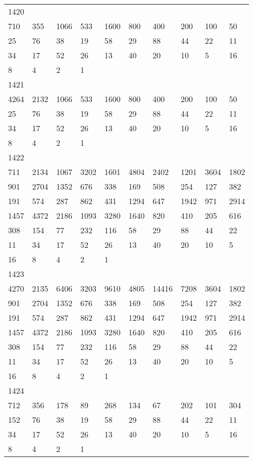 \begin{longtable}{*{10}{l}}
1420&&&&&&&&&\\
710& 355& 1066& 533& 1600& 800& 400& 200& 100& 50\\
25& 76& 38& 19& 58& 29& 88& 44& 22& 11\\
34& 17& 52& 26& 13& 40& 20& 10& 5& 16\\
8& 4& 2& 1& \\

1421&&&&&&&&&\\
4264& 2132& 1066& 533& 1600& 800& 400& 200& 100& 50\\
25& 76& 38& 19& 58& 29& 88& 44& 22& 11\\
34& 17& 52& 26& 13& 40& 20& 10& 5& 16\\
8& 4& 2& 1& \\

1422&&&&&&&&&\\
711& 2134& 1067& 3202& 1601& 4804& 2402& 1201& 3604& 1802\\
901& 2704& 1352& 676& 338& 169& 508& 254& 127& 382\\
191& 574& 287& 862& 431& 1294& 647& 1942& 971& 2914\\
1457& 4372& 2186& 1093& 3280& 1640& 820& 410& 205& 616\\
308& 154& 77& 232& 116& 58& 29& 88& 44& 22\\
11& 34& 17& 52& 26& 13& 40& 20& 10& 5\\
16& 8& 4& 2& 1& \\

1423&&&&&&&&&\\
4270& 2135& 6406& 3203& 9610& 4805& 14416& 7208& 3604& 1802\\
901& 2704& 1352& 676& 338& 169& 508& 254& 127& 382\\
191& 574& 287& 862& 431& 1294& 647& 1942& 971& 2914\\
1457& 4372& 2186& 1093& 3280& 1640& 820& 410& 205& 616\\
308& 154& 77& 232& 116& 58& 29& 88& 44& 22\\
11& 34& 17& 52& 26& 13& 40& 20& 10& 5\\
16& 8& 4& 2& 1& \\

1424&&&&&&&&&\\
712& 356& 178& 89& 268& 134& 67& 202& 101& 304\\
152& 76& 38& 19& 58& 29& 88& 44& 22& 11\\
34& 17& 52& 26& 13& 40& 20& 10& 5& 16\\
8& 4& 2& 1& \\


\end{longtable}
